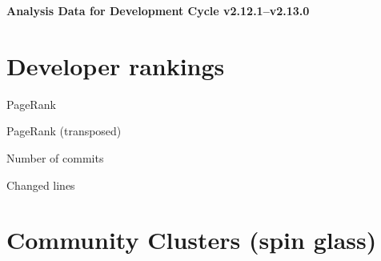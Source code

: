 \documentclass{article}
\begin{document}
\setlength{\parindent}{0pt}
\begin{center}
\begin{Large}
\textbf{Analysis Data for Development Cycle v2.12.1--v2.13.0}
\end{Large}
\end{center}
\section{Developer rankings}
\begin{small}\renewcommand{\tabcolsep}{1pt}
\begin{minipage}{0.5\linewidth}
PageRank\\

\end{minipage}%
\begin{minipage}{0.5\linewidth}
PageRank (transposed)\\

\end{minipage}

\renewcommand{\tabcolsep}{5pt}
\begin{minipage}{0.5\linewidth}
Number of commits\\

\end{minipage}%
\begin{minipage}{0.5\linewidth}
Changed lines\\

\end{minipage}
\end{small}
\newpage\section{Community Clusters (spin glass)}
\end{document}
